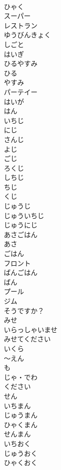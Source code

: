 \documentclass[8pt]{extreport}
\begin{document}
\begin{CJK}{UTF8}{min}
\\	ひゃく		
\\	スーパー		
\\	レストラン		
\\	ゆうびんきょく		
\\	しごと		
\\	はいぎ		
\\	ひるやすみ		
\\	ひる		
\\	やすみ		
\\	パーテイー		
\\	はいが		
\\	はん		
\\	いちじ		
\\	にじ		
\\	さんじ		
\\	よじ		
\\	ごじ		
\\	ろくじ		
\\	しちじ		
\\	ちじ		
\\	くじ		
\\	じゅうじ		
\\	じゅういちじ		
\\	じゅうにじ		
\\	あさごはん		
\\	あさ		
\\	ごはん		
\\	フロント		
\\	ばんごはん		
\\	ばん		
\\	プール		
\\	ジム		
\\	そうですか？		
\\	みせ		
\\	いらっしゃいませ		
\\	みせてください		
\\	いくら		
\\	〜えん		
\\	も		
\\	じゃ・でわ		
\\	ください		
\\	せん		
\\	いちまん		
\\	じゅうまん		
\\	ひゃくまん		
\\	せんまん		
\\	いちおく		
\\	じゅうおく		
\\	ひゃくおく		

\end{CJK}
\end{document}
